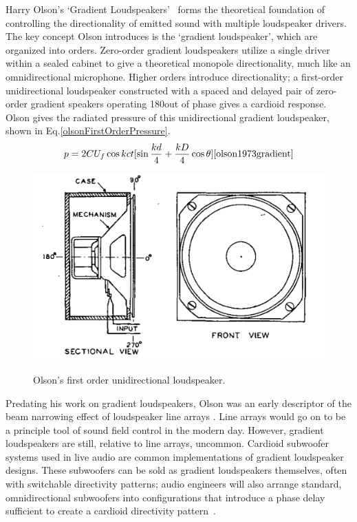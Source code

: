 \documentclass{report}
\begin{document}
        Harry Olson's `Gradient Loudspeakers'~\cite{olson1973gradient} forms the theoretical foundation of controlling the directionality of emitted sound with multiple loudspeaker drivers.
        The key concept Olson introduces is the `gradient loudspeaker', which are organized into orders.
        Zero-order gradient loudspeakers utilize a single driver within a sealed cabinet to give a theoretical monopole directionality, much like an omnidirectional microphone.
        Higher orders introduce directionality; a first-order unidirectional loudspeaker constructed with a spaced and delayed pair of zero-order gradient speakers operating 180\degree\@ out of phase gives a cardioid response.
        Olson gives the radiated pressure of this unidirectional gradient loudspeaker, shown in Eq.\ref{olsonFirstOrderPressure}.
        \begin{equation}
            p = 2CU_f\cos{kct}[\sin{\frac{kd}{4}+\frac{kD}{4}\cos{\theta}}]
            \label{olsonFirstOrderPressure}
            \cite{olson1973gradient}
        \end{equation}
        \begin{figure}[H]
            \centering
            \includegraphics[scale=0.2]{figs/olsonFirstOrder.png}%
            \caption{Olson's first order unidirectional loudspeaker.}\cite{olson1973gradient}
            \label{olsonFirstOrderDiagram}
        \end{figure}
        Predating his work on gradient loudspeakers, Olson was an early descriptor of the beam narrowing effect of loudspeaker line arrays \cite{olson1957acoustical}.
        Line arrays would go on to be a principle tool of sound field control in the modern day.
        However, gradient loudspeakers are still, relative to line arrays, uncommon.
        Cardioid subwoofer systems used in live audio are common implementations of gradient loudspeaker designs.
        These subwoofers can be sold as gradient loudspeakers themselves, often with switchable directivity patterns; audio engineers will also arrange standard, omnidirectional subwoofers into configurations that introduce a phase delay sufficient to create a cardioid directivity pattern~\cite{curtis2022cardioidsubs}.
\end{document}
